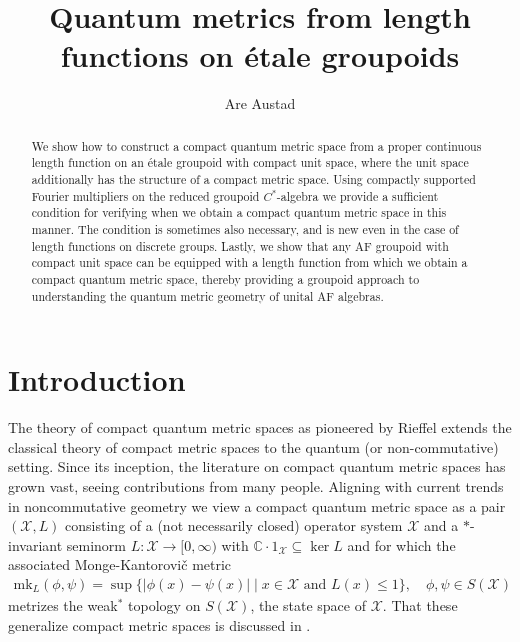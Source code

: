 \documentclass[11pt,a4paper,oneside,final,reqno]{amsart}
\title[]{Quantum metrics from length functions on \'etale groupoids}
\author[1]{Are Austad}
\theoremstyle{definition}
\newcommand{\cX}{\mathcal{X}}
\newcommand{\mk}{\mathrm{mk}}
\newcommand{\C}{\mathbb{C}}
\numberwithin{equation}{section}
\begin{document}
	
	
	
	\maketitle

	\begin{abstract}
		We show how to construct a compact quantum metric space from a proper continuous  length function on an \'etale groupoid with compact unit space, where the unit space additionally has the structure of a compact metric space. 
		Using compactly supported Fourier multipliers on the reduced groupoid $C^*$-algebra we provide a sufficient condition for verifying when we obtain a compact quantum metric space in this manner. The condition is sometimes also necessary, and is new even in the case of length functions on discrete groups. 
		Lastly, we show that any AF groupoid with compact unit space can be equipped with a length function from which we obtain a compact quantum metric space, thereby providing a groupoid approach to understanding the quantum metric geometry of unital AF algebras. 
	\end{abstract}


	



	\section{Introduction}
	The theory of compact quantum metric spaces as pioneered by Rieffel \cite{RieffelMetricsOnStateSpaces1999, RieffelCQMS04, Rieffel2004qGH, Rieffel2004MatrixAlgs, RieffelMartricialBridges2016} extends the classical theory of compact metric spaces to the quantum (or non-commutative) setting. 
	Since its inception, the literature on compact quantum metric spaces has grown vast, seeing contributions from many people. 
	Aligning with current trends in noncommutative geometry \cite{vanSuiljekom21, CvSSpecTrunc21, CvSTolerance22, GielenSuijlekom23, RieffelTruncations23, LeimbachSuijlekom24, KaadExternal24}
	we view a compact quantum metric space as a pair $(\cX, L)$ consisting of a (not necessarily closed) operator system $\cX$ and a $*$-invariant seminorm $L \colon \cX \to [0,\infty)$ with $\C \cdot 1_{\cX} \subseteq \ker L$ and for which the associated Monge-Kantorovi\v{c} metric
	\begin{align*}
		\mk_L(\phi, \psi) = \sup \{ \vert \phi(x) - \psi(x) \vert \mid x\in \cX \text{ and } L(x) \leq 1\}, \quad \phi,\psi \in S(\cX)
	\end{align*} 
	metrizes the weak$^*$ topology on $S(\cX)$, the state space of $\cX$. That these generalize compact metric spaces is discussed in \cite{RieffelCQMS04}. 
	
\end{document}
